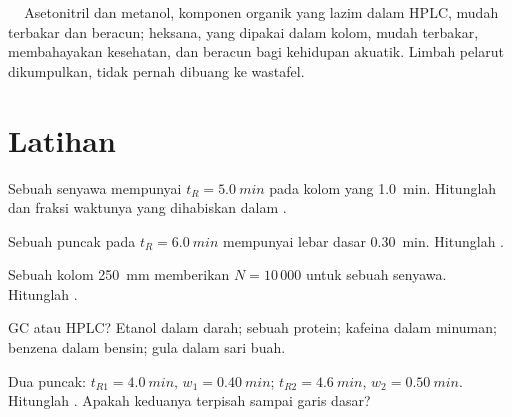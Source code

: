 \begin{safety}{\,\,\,\,\,}
Asetonitril dan metanol, komponen organik yang lazim dalam  HPLC,
mudah terbakar dan beracun; heksana, yang dipakai dalam  kolom,
mudah terbakar, membahayakan kesehatan, dan beracun bagi kehidupan akuatik.
Limbah pelarut dikumpulkan, tidak pernah dibuang ke wastafel.
\end{safety}

\section{Latihan}

\begin{exercise}[$\star$]\label{exo:b2:chromatography:1}
Sebuah senyawa mempunyai $t_R = \qty{5.0}{min}$ pada kolom yang 
\qty{1.0}{min}. Hitunglah  dan fraksi waktunya yang
dihabiskan dalam .
\end{exercise}

\begin{exercise}[$\star$]\label{exo:b2:chromatography:2}
Sebuah puncak pada $t_R = \qty{6.0}{min}$ mempunyai lebar dasar \qty{0.30}{min}. Hitunglah .
\end{exercise}

\begin{exercise}[$\star$]\label{exo:b2:chromatography:3}
Sebuah kolom \qty{250}{mm} memberikan $N = 10\,000$ untuk sebuah senyawa. Hitunglah .
\end{exercise}

\begin{exercise}[$\star$]\label{exo:b2:chromatography:4}
GC atau HPLC? Etanol dalam darah; sebuah protein; kafeina dalam minuman; benzena dalam bensin; gula dalam sari buah.
\end{exercise}

\begin{exercise}[$\star\star$]\label{exo:b2:chromatography:5}
Dua puncak: $t_{R1} = \qty{4.0}{min}$, $w_1 = \qty{0.40}{min}$; $t_{R2} = \qty{4.6}{min}$, $w_2 =
\qty{0.50}{min}$. Hitunglah . Apakah keduanya terpisah sampai garis dasar?
\end{exercise}

